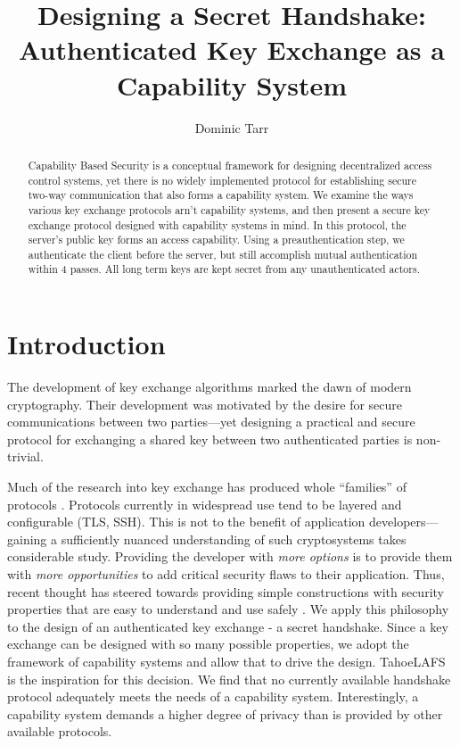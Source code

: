 \documentclass[12pt]{article}
\begin{document}
\title{Designing a Secret Handshake: Authenticated Key Exchange as a Capability System}
\author{Dominic Tarr}


\maketitle

\begin{abstract}
Capability Based Security is a conceptual framework for designing
decentralized access control systems, yet there is no widely
implemented protocol for establishing secure two-way communication
that also forms a capability system.
We examine the ways various key exchange protocols arn't
capability systems, and then present a secure key
exchange protocol designed with capability systems in mind.
In this protocol, the server's public key forms an access capability.
Using a preauthentication step, we authenticate the client before
the server, but still accomplish mutual authentication within 4 passes.
All long term keys are kept secret from any unauthenticated actors.

\end{abstract}

\section{Introduction}

The development of key exchange algorithms marked the dawn of
modern cryptography\cite{ndic}. Their development was motivated
by the desire for secure communications between two parties---yet
designing a practical and secure protocol for exchanging
a shared key between two authenticated parties is non-trivial\cite{aake}.

Much of the research into key exchange has produced whole ``families'' of
protocols \cite{sigma}. Protocols currently in widespread
use tend to be layered and configurable (TLS, SSH). This is not
to the benefit of application developers---gaining a sufficiently
nuanced understanding of such cryptosystems takes considerable study.
Providing the developer with \emph{more options} is to provide them
with \emph{more opportunities} to add critical security flaws to their
application. Thus, recent thought has steered towards providing simple constructions
with security properties that are easy to understand and use safely
\cite{nacl}. We apply this philosophy to the design of an authenticated
key exchange - a secret handshake. Since a key exchange can be designed
with so many possible properties, we adopt the framework of capability
systems\cite{unicap} and allow that to drive the design.
TahoeLAFS\cite{tahoe} is the inspiration for this decision.
We find that no currently available handshake protocol adequately meets
the needs of a capability system. Interestingly, a capability system
demands a higher degree of privacy than is provided by other available
protocols.
\end{document}
